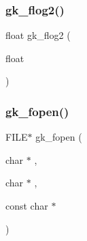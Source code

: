 \subsubsection{\texorpdfstring{gk\+\_\+flog2()}{gk\_flog2()}}
{\footnotesize\ttfamily float gk\+\_\+flog2 (\begin{DoxyParamCaption}\item[{float}]{ }\end{DoxyParamCaption})}

\mbox{\label{a00077_ab2b996e10c5bccb30204d81804adfd24}} 
\subsubsection{\texorpdfstring{gk\+\_\+fopen()}{gk\_fopen()}}
{\footnotesize\ttfamily F\+I\+LE$\ast$ gk\+\_\+fopen (\begin{DoxyParamCaption}\item[{char $\ast$}]{,  }\item[{char $\ast$}]{,  }\item[{const char $\ast$}]{ }\end{DoxyParamCaption})}

